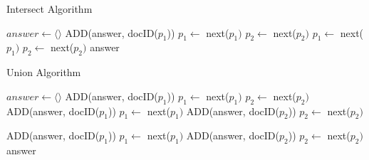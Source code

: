 \documentclass{article}
\begin{document}
\begin{algorithm}
\caption{Intersect Algorithm}
\begin{algorithmic}
    \State $answer \leftarrow \langle \rangle$
            \State ADD(answer, docID($p_1$))
            \State $p_1 \leftarrow$ next($p_1)$
            \State $p_2 \leftarrow$ next($p_2)$
            \State $p_1 \leftarrow$ next($p_1)$
        \Else 
            \State $p_2 \leftarrow$ next($p_2)$
        \EndIf
    \EndWhile
    \Return answer
    \EndProcedure
\end{algorithmic}
\end{algorithm}

\begin{algorithm}
\caption{Union Algorithm}
\begin{algorithmic}
    \State $answer \leftarrow \langle \rangle$
            \State ADD(answer, docID($p_1$))
            \State $p_1 \leftarrow$ next($p_1)$
            \State $p_2 \leftarrow$ next($p_2)$
            \State ADD(answer, docID($p_1$))
            \State $p_1 \leftarrow$ next($p_1)$
        \Else 
            \State ADD(answer, docID($p_2$))
            \State $p_2 \leftarrow$ next($p_2)$
        \EndIf
    \EndWhile
    
        
            \State ADD(answer,  docID($p_1$))
            \State $p_1 \leftarrow$ next($p_1)$
        \EndWhile
    \EndIf
      
            \State ADD(answer,  docID($p_2$))
            \State $p_2 \leftarrow$ next($p_2)$
        \EndWhile
    \EndIf
    \Return answer
    \EndProcedure
\end{algorithmic}
\end{algorithm}
\end{document}
